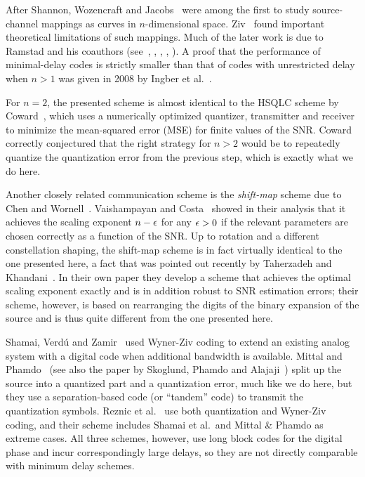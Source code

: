 After Shannon, Wozencraft and Jacobs~\cite{WozencraftJ1965} were among the first
to study source-channel mappings as curves in $n$-dimensional space.
Ziv~\cite{Ziv1970} found important theoretical limitations of such mappings.
Much of the later work is due to Ramstad and his coauthors
(see~\cite{Ramstad2002}, \cite{FloorR2006}, \cite{CowardR2000,CowardR2000a},
\cite{WernerssonSR2007}, \cite{HeklandFR2009}). A proof that the performance of
minimal-delay codes is strictly smaller than that of codes with unrestricted
delay when $n>1$ was given in 2008 by Ingber et al.~\cite{IngberLZF2008}.

For $n=2$, the presented scheme is almost identical to the HSQLC scheme by
Coward~\cite{Coward2001}, which uses a numerically optimized quantizer,
transmitter and receiver to minimize the mean-squared error (MSE) for finite
values of the SNR. Coward correctly conjectured that the right strategy for $n >
2$ would be to repeatedly quantize the quantization error from the previous
step, which is exactly what we do here.

Another closely related communication scheme is the \emph{shift-map} scheme due
to Chen and Wornell~\cite{ChenW1998}.  Vaishampayan and
Costa~\cite{VaishampayanC2003} showed in their analysis that it achieves the
scaling exponent $n-\epsilon$ for any $\epsilon > 0$ if the relevant parameters are chosen
correctly as a function of the SNR. Up to rotation and a different constellation
shaping, the shift-map scheme is in fact virtually identical to the one
presented here, a fact that was pointed out recently by Taherzadeh and
Khandani~\cite{TaherzadehK2008}. In their own paper they develop a scheme that
achieves the optimal scaling exponent exactly and is in addition robust to SNR
estimation errors; their scheme, however, is based on rearranging the digits of
the binary expansion of the source and is thus quite different from the one
presented here.

Shamai, Verd\'u and Zamir~\cite{ShamaiVZ1998} used Wyner-Ziv coding to extend an
existing analog system with a digital code when additional bandwidth is
available. Mittal and Phamdo~\cite{MittalP2002} (see also the paper by Skoglund,
Phamdo and Alajaji~\cite{SkoglundPA2002}) split up the source into a quantized
part and a quantization error, much like we do here, but they use a
separation-based code (or ``tandem'' code) to transmit the quantization symbols.
Reznic et al.~\cite{ReznicFZ2006} use both quantization and Wyner-Ziv coding,
and their scheme includes Shamai et al.\ and Mittal \& Phamdo as extreme cases.
All three schemes, however, use long block codes for the digital phase and incur
correspondingly large delays, so they are not directly comparable with minimum
delay schemes.




